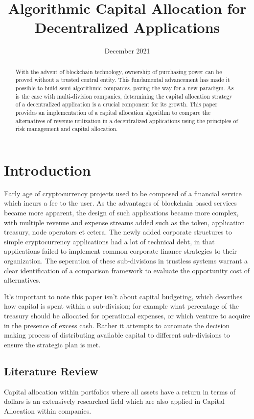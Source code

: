 \documentclass[conference,letterpaper]{IEEEtran}
\title{Algorithmic Capital Allocation for Decentralized Applications}
\author{\IEEEauthorblockN{Orhan Koc}
    \IEEEauthorblockA{ hankoc@onchainfactory.com} }
\date{December 2021}
\begin{document}
    \maketitle
    \begin{abstract}
        With the advent of blockchain technology, ownership of purchasing power can be
        proved without a trusted central entity. This fundamental advancement has made it
        possible to build semi algorithmic companies, paving the way for a new paradigm.
        As is the case with multi-division companies, determining the capital allocation
        strategy of a decentralized application is a crucial component for its growth.
        This paper provides an implementation of a capital allocation algorithm to compare
        the alternatives of revenue utilization in a decentralized applications using the
        principles of risk management and capital allocation.
    \end{abstract}

    \section{Introduction}
        Early age of cryptocurrency projects used to be composed of a financial service
        which incurs a fee to the user. As the advantages of blockchain based services
        became more apparent, the design of such applications became more complex, with
        multiple revenue and expense streams added such as the token, application
        treasury, node operators et cetera. The newly added corporate structures to simple
        cryptocurrency applications had a lot of technical debt, in that applications
        failed to implement common corporate finance strategies to their organization. The
        seperation of these sub-divisions in trustless systems warrant a clear
        identification of a comparison framework to evaluate the opportunity cost of
        alternatives. 
        
        It's important to note this paper isn't about capital budgeting, which describes
        how capital is spent within a sub-division; for example what percentage of the
        treasury should be allocated for operational expenses, or which venture to acquire
        in the presence of excess cash. Rather it attempts to automate the decision making
        process of distributing available capital to different sub-divisions to ensure the
        strategic plan is met.        

        \subsection{Literature Review}
            Capital allocation within portfolios where all assets have a return in terms
            of dollars is an extensively researched field which are also applied in
            Capital Allocation within companies.
\end{document}
